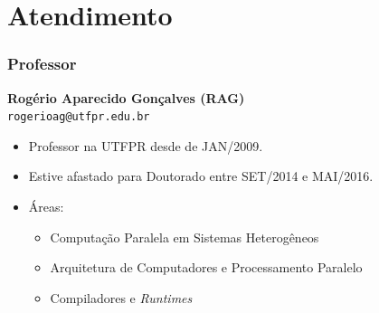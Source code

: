 \documentclass{beamer}
\begin{document}
\section[Atendimento]{Atendimento}
\begin{frame}
	\frametitle{Professor}
	\fontsize{14pt}{7.2}\selectfont
	\begin{minipage}[t][\textheight][t]{\textwidth}
		\vspace{1.0cm}
	\begin{center}
		\textbf{Rogério Aparecido Gonçalves (RAG)} \\
		\texttt{rogerioag@utfpr.edu.br}
	\end{center}
	\begin{itemize}
		\item Professor na UTFPR desde de JAN/2009.
		\item Estive afastado para Doutorado entre SET/2014 e MAI/2016.
		\item Áreas:
		\begin{itemize}
			\fontsize{14pt}{7.2}\selectfont
			\item Computação Paralela em Sistemas Heterogêneos
			\item Arquitetura de Computadores e Processamento Paralelo
			\item Compiladores e \emph{Runtimes}
		\end{itemize}
	\end{itemize}
	\end{minipage}
\end{frame}
\end{document}
